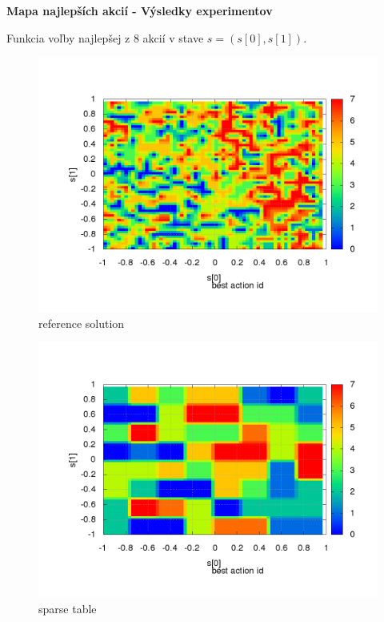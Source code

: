 \documentclass[xcolor=dvipsnames]{beamer}
\begin{document}
\begin{frame}{\bf Mapa najlepších akcií - Výsledky experimentov}

Funkcia voľby najlepšej z 8 akcií v stave  $s = (s[0], s[1])$.

\begin{minipage}{.5\textwidth}

\begin{figure}[!htb]
\centering
\includegraphics[scale=.21]{../../results_q_learning/map_2/function_type_0/iterations_10/action_best_value_log_surface.png}
\caption{reference solution}
\end{figure}

\end{minipage}%
\begin{minipage}{.5\textwidth}

\begin{figure}[!htb]
\centering
\includegraphics[scale=.21]{../../results_q_learning/map_2/function_type_1/iterations_10/action_best_value_log_surface.png}
\caption{sparse table}
\end{figure}


\end{minipage}
\end{frame}
\end{document}
